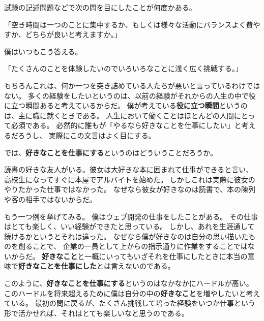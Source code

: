 \documentclass[landscape]{tarticle}
\begin{document}
試験の記述問題などで次の問を目にしたことが何度かある。

「空き時間は一つのことに集中するか、もしくは様々な活動にバランスよく費やすか、どちらが良いと考えますか。」

僕はいつもこう答える。

「たくさんのことを体験したいのでいろいろなことに浅く広く挑戦する。」

もちろんこれは、何か一つを突き詰めている人たちが悪いと言っているわけではない。
多くの経験をしたいというのは、以前の経験がそれからの人生の中で役に立つ瞬間あると考えているからだ。
僕が考えている{\bf 役に立つ瞬間}というのは、主に職に就くときである。
人生において働くことはほとんどの人間にとって必須である。
必然的に誰もが「やるなら好きなことを仕事にしたい」と考えるだろうし、
実際にこの文言はよく目にする。

では、{\bf 好きなことを仕事にする}というのはどういうことだろうか。

読書の好きな友人がいる。彼女は大好きな本に囲まれて仕事ができると言い、
高校生になってすぐに本屋でアルバイトを始めた。
しかしこれは実際に彼女のやりたかった仕事ではなかった。
なぜなら彼女が好きなのは読書で、本の陳列や客の相手ではないからだ。

もう一つ例を挙げてみる。
僕はウェブ開発の仕事をしたことがある。
その仕事はとても楽しく、いい経験ができたと思っている。
しかし、あれを生涯通して続けるかというとそれは違った。
なぜなら僕が好きなのは自分の思い描いたものを創ることで、
企業の一員として上からの指示通りに作業をすることではないからだ。
{\bf 好きなこと}と一概にいってもいざそれを仕事にしたときに本当の意味で{\bf 好きなことを仕事にした}とは言えないのである。

このように、{\bf 好きなことを仕事にする}というのはなかなかにハードルが高い。
このハードルを将来超えるために僕は自分の中の{\bf 好きなこと}を増やしたいと考えている。
最初の問に戻るが、たくさん挑戦して培った経験をいつか仕事という形で活かせれば、それはとても楽しいなと思うのである。
\end{document}
